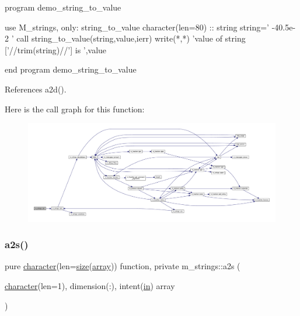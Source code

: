 \begin{DoxyVerb}program demo_string_to_value

 use M_strings, only: string_to_value
 character(len=80) :: string
    string=' -40.5e-2 '
    call string_to_value(string,value,ierr)
    write(*,*) 'value of string ['//trim(string)//'] is ',value

end program demo_string_to_value \end{DoxyVerb}
 

References a2d().

Here is the call graph for this function\+:
\nopagebreak
\begin{figure}[H]
\begin{center}
\leavevmode
\includegraphics[width=350pt]{namespacem__strings_a6b4babf586dc3586426b13e4bb0fb979_cgraph}
\end{center}
\end{figure}
\mbox{\label{namespacem__strings_a9365ae5277199446d93fc5208be2e9a5}} 
\subsubsection{\texorpdfstring{a2s()}{a2s()}}
{\footnotesize\ttfamily pure \hyperlink{option__stopwatch_83_8txt_abd4b21fbbd175834027b5224bfe97e66}{character}(len=\hyperlink{what__overview_81_8txt_ab5692ed87074f1d5ec850a9ffa8b5af9}{size}(\hyperlink{intro__blas1_83_8txt_a89db1945e1a335ab0184c6a097821e32}{array})) function, private m\+\_\+strings\+::a2s (\begin{DoxyParamCaption}\item[{\hyperlink{option__stopwatch_83_8txt_abd4b21fbbd175834027b5224bfe97e66}{character}(len=1), dimension(\+:), intent(\hyperlink{M__journal_83_8txt_afce72651d1eed785a2132bee863b2f38}{in})}]{array }\end{DoxyParamCaption})\hspace{0.3cm}{\ttfamily [private]}}



